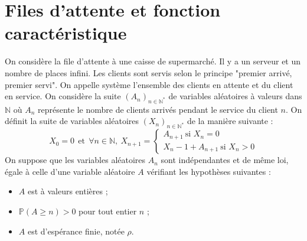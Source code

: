 \documentclass[french,a4paper]{article}
\renewcommand{\P}{\mathbb{P}}
\newcommand{\N}{\mathbb{N}}
\newcommand{\st}{^*}
\theoremstyle{plain}
\theoremstyle{definition}
\theoremstyle{remark}
\begin{document}
\section{Files d'attente et fonction caractéristique}

On considère la file d'attente à une caisse de supermarché. Il y a un serveur et un nombre de places infini. Les clients sont servis selon le principe "premier arrivé, premier servi". On appelle système l'ensemble des clients en attente et du client en service. On considère la suite $(A_n)_{n\in\N\st}$ de variables aléatoires à valeurs dans $\N$ où $A_n$ représente le nombre de clients arrivés pendant le service du client $n$. On définit la suite de variables aléatoires $(X_n)_{n\in\N\st}$ de la manière suivante : $$X_0=0\ \ \text{et} \ \ \forall n\in\N,\ X_{n+1}=\begin{cases}
	A_{n+1}\ \text{si }X_n=0\\
	X_{n}-1+A_{n+1}\ \text{si }X_n>0
\end{cases}$$ On suppose que les variables aléatoires $A_n$ sont indépendantes et de même loi, égale à celle d'une variable aléatoire $A$ vérifiant les hypothèses suivantes : 
\begin{itemize}
	\item $A$ est à valeurs entières ;
	\item $\P(A\geqslant n)>0$ pour tout entier $n$ ;
	\item $A$ est d'espérance finie, notée $\rho$.
\end{itemize}
\end{document}
